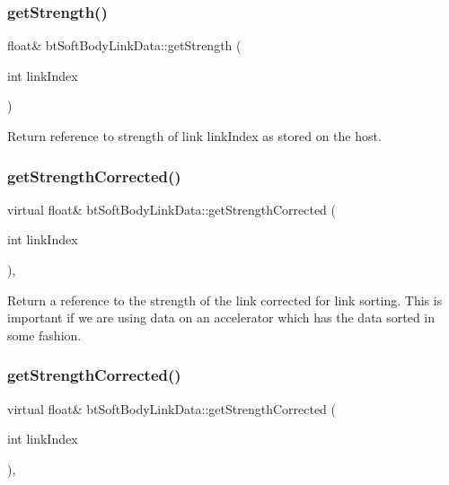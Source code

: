 \subsubsection{\texorpdfstring{get\+Strength()}{getStrength()}\hspace{0.1cm}{\footnotesize\ttfamily [2/2]}}
{\footnotesize\ttfamily float\& bt\+Soft\+Body\+Link\+Data\+::get\+Strength (\begin{DoxyParamCaption}\item[{int}]{link\+Index }\end{DoxyParamCaption})\hspace{0.3cm}{\ttfamily [inline]}}

Return reference to strength of link link\+Index as stored on the host. \mbox{\label{classbtSoftBodyLinkData_a3b6e8d1a150ec23efd999760ea7a17b3}} 
\subsubsection{\texorpdfstring{get\+Strength\+Corrected()}{getStrengthCorrected()}\hspace{0.1cm}{\footnotesize\ttfamily [1/2]}}
{\footnotesize\ttfamily virtual float\& bt\+Soft\+Body\+Link\+Data\+::get\+Strength\+Corrected (\begin{DoxyParamCaption}\item[{int}]{link\+Index }\end{DoxyParamCaption})\hspace{0.3cm}{\ttfamily [inline]}, {\ttfamily [virtual]}}

Return a reference to the strength of the link corrected for link sorting. This is important if we are using data on an accelerator which has the data sorted in some fashion. \mbox{\label{classbtSoftBodyLinkData_a3b6e8d1a150ec23efd999760ea7a17b3}} 
\subsubsection{\texorpdfstring{get\+Strength\+Corrected()}{getStrengthCorrected()}\hspace{0.1cm}{\footnotesize\ttfamily [2/2]}}
{\footnotesize\ttfamily virtual float\& bt\+Soft\+Body\+Link\+Data\+::get\+Strength\+Corrected (\begin{DoxyParamCaption}\item[{int}]{link\+Index }\end{DoxyParamCaption})\hspace{0.3cm}{\ttfamily [inline]}, {\ttfamily [virtual]}}

